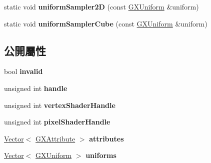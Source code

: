 \begin{DoxyCompactItemize}
\item 
static void {\bfseries uniform\+Sampler2D} (const \hyperlink{class_magnum_1_1_g_x_uniform}{G\+X\+Uniform} \&uniform)\hypertarget{class_magnum_1_1_g_x_shader_program_ad30afdebc64f8c9f1a491958a4ce7802}{}\label{class_magnum_1_1_g_x_shader_program_ad30afdebc64f8c9f1a491958a4ce7802}

\item 
static void {\bfseries uniform\+Sampler\+Cube} (const \hyperlink{class_magnum_1_1_g_x_uniform}{G\+X\+Uniform} \&uniform)\hypertarget{class_magnum_1_1_g_x_shader_program_a7cb6015dfabd087bf817cc59d25d29cf}{}\label{class_magnum_1_1_g_x_shader_program_a7cb6015dfabd087bf817cc59d25d29cf}

\end{DoxyCompactItemize}
\subsection*{公開屬性}
\begin{DoxyCompactItemize}
\item 
bool {\bfseries invalid}\hypertarget{class_magnum_1_1_g_x_shader_program_ab56c81415f470575902d917417586341}{}\label{class_magnum_1_1_g_x_shader_program_ab56c81415f470575902d917417586341}

\item 
unsigned int {\bfseries handle}\hypertarget{class_magnum_1_1_g_x_shader_program_aef6a93e9a70d80def6a378d368865d85}{}\label{class_magnum_1_1_g_x_shader_program_aef6a93e9a70d80def6a378d368865d85}

\item 
unsigned int {\bfseries vertex\+Shader\+Handle}\hypertarget{class_magnum_1_1_g_x_shader_program_af4fd047c707d39a3cae4e123e706e383}{}\label{class_magnum_1_1_g_x_shader_program_af4fd047c707d39a3cae4e123e706e383}

\item 
unsigned int {\bfseries pixel\+Shader\+Handle}\hypertarget{class_magnum_1_1_g_x_shader_program_ac1f268f183a1b29b57635c521a179e59}{}\label{class_magnum_1_1_g_x_shader_program_ac1f268f183a1b29b57635c521a179e59}

\item 
\hyperlink{class_magnum_1_1_vector}{Vector}$<$ \hyperlink{class_magnum_1_1_g_x_attribute}{G\+X\+Attribute} $>$ {\bfseries attributes}\hypertarget{class_magnum_1_1_g_x_shader_program_a93438c710ee4daf080fd99ab7f25fa64}{}\label{class_magnum_1_1_g_x_shader_program_a93438c710ee4daf080fd99ab7f25fa64}

\item 
\hyperlink{class_magnum_1_1_vector}{Vector}$<$ \hyperlink{class_magnum_1_1_g_x_uniform}{G\+X\+Uniform} $>$ {\bfseries uniforms}\hypertarget{class_magnum_1_1_g_x_shader_program_a7193785a170c1d97d5f5e5ef9951e3f2}{}\label{class_magnum_1_1_g_x_shader_program_a7193785a170c1d97d5f5e5ef9951e3f2}

\end{DoxyCompactItemize}
